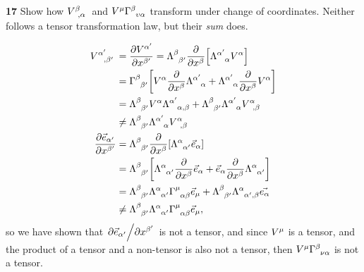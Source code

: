 \documentclass[gr-notes.tex]{subfiles}
\begin{document}
\textbf{17}
Show how $\tensor{V}{^\beta_{,\alpha}}$ and $V^\mu \tensor{\Gamma}{^\beta_{\upsilon\alpha}}$ transform under change of coordinates. Neither follows a tensor transformation law, but their \emph{sum} does.

\begin{align*}
  \tensor{V}{^{\alpha'}_{,\beta'}} &=
  \pdv{V^{\alpha'}}{x^{\beta'}} =
  \tensor{\Lambda}{^\beta_{\beta'}}
  \pdv{x^\beta} \qty[ \tensor{\Lambda}{^{\alpha'}_\alpha} V^\alpha ]
  \\ &=
  \tensor{\Gamma}{^\beta_{\beta'}} \qty[
    V^\alpha \pdv{x^\beta} \tensor{\Lambda}{^{\alpha'}_\alpha} +
    \tensor{\Lambda}{^{\alpha'}_\alpha} \pdv{x^\beta} V^\alpha
  ]
  \\ &=
  \tensor{\Lambda}{^\beta_{\beta'}} V^\alpha
  \tensor{\Lambda}{^{\alpha'}_{\alpha,\beta}} +
  \tensor{\Lambda}{^\beta_{\beta'}} \tensor{\Lambda}{^{\alpha'}_\alpha}
  \tensor{V}{^\alpha_{,\beta}}
  \\ &\neq
  \tensor{\Lambda}{^\beta_{\beta'}} \tensor{\Lambda}{^{\alpha'}_\alpha}
  \tensor{V}{^\alpha_{,\beta}}
  \\
  \pdv{\vec{e}_{\alpha'}}{x^{\beta'}} &=
  \tensor{\Lambda}{^\beta_{\beta'}}
  \pdv{x^\beta} \qty[ \tensor{\Lambda}{^\alpha_{\alpha'}} \vec{e}_\alpha ]
  \\ &=
  \tensor{\Lambda}{^\beta_{\beta'}} \qty[
    \tensor{\Lambda}{^\alpha_{\alpha'}} \pdv{x^\beta} \vec{e}_\alpha +
    \vec{e}_\alpha \pdv{x^\beta} \tensor{\Lambda}{^\alpha_{\alpha'}}
  ]
  \\ &=
  \tensor{\Lambda}{^\beta_{\beta'}}
  \tensor{\Lambda}{^\alpha_{\alpha'}}
  \tensor{\Gamma}{^\mu_{\alpha\beta}} \vec{e}_\mu +
  \tensor{\Lambda}{^\beta_{\beta'}}
  \tensor{\Lambda}{^\alpha_{\alpha',\beta}}
  \vec{e_\alpha}
  \\ &\neq
  \tensor{\Lambda}{^\beta_{\beta'}}
  \tensor{\Lambda}{^\alpha_{\alpha'}}
  \tensor{\Gamma}{^\mu_{\alpha\beta}} \vec{e}_\mu,
\end{align*}
%
so we have shown that $\pdv*{\vec{e}_{\alpha'}}{x^{\beta'}}$ is not a tensor,
and since $\tensor{V}{^\mu}$ is a tensor, and the product of a tensor and a non-tensor is also not a tensor, then $V^\mu\tensor{\Gamma}{^\beta_{\nu\alpha}}$ is not a tensor.
\end{document}

